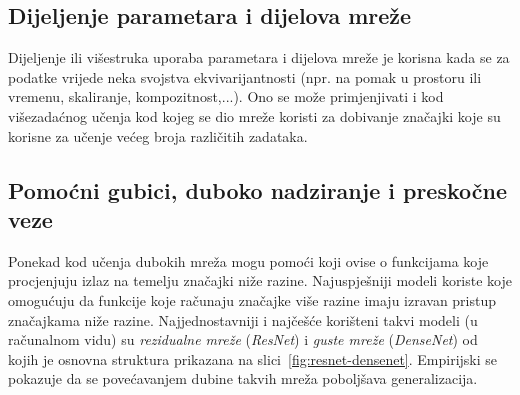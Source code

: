 \documentclass[utf8, diplomski, lmodern]{fer}
\begin{document}
\subsection{Dijeljenje parametara i dijelova mreže}

Dijeljenje ili višestruka uporaba parametara i dijelova mreže je korisna kada se za podatke vrijede neka svojstva ekvivarijantnosti (npr. na pomak u prostoru ili vremenu, skaliranje, kompozitnost,...). Ono se može primjenjivati i kod višezadaćnog učenja kod kojeg se dio mreže koristi za dobivanje značajki koje su korisne za učenje većeg broja različitih zadataka.

\subsection{Pomoćni gubici, duboko nadziranje i preskočne veze}

Ponekad kod učenja dubokih mreža mogu pomoći  koji ovise o funkcijama koje procjenjuju izlaz na temelju značajki niže razine. Najuspješniji modeli koriste  koje omogućuju da funkcije koje računaju značajke više razine imaju izravan pristup značajkama niže razine. Najjednostavniji i najčešće korišteni takvi modeli (u računalnom vidu) su \textit{rezidualne mreže} (\textit{ResNet}) \citep{He:2015:DRLIR,He:2016:IMDRL} i \textit{guste mreže} (\textit{DenseNet}) \citep{Huang:2016:DCCN} od kojih je osnovna struktura prikazana na slici~\ref{fig:resnet-densenet}. Empirijski se pokazuje da se povećavanjem dubine takvih mreža poboljšava generalizacija.
\end{document}
